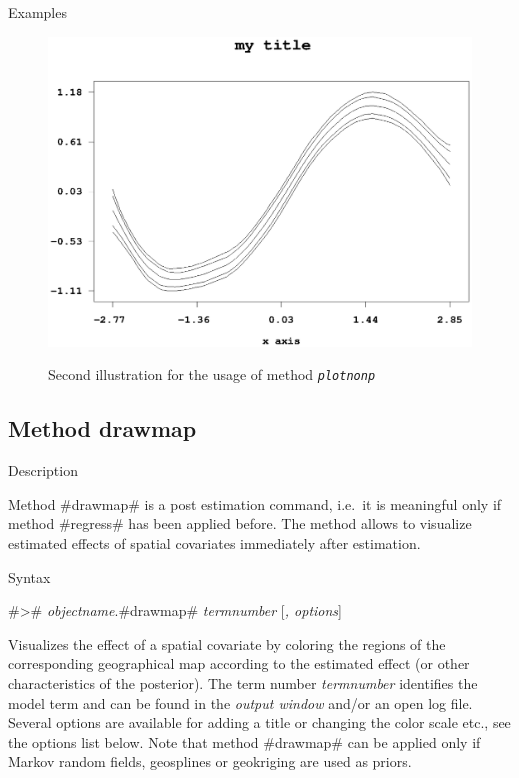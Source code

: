 \begin{stanza}{Examples}
\begin{figure}[p]
\begin{center}
\includegraphics[scale=0.8]{grafiken/plotnonpexample2.ps}
{\em\caption{ \label{plotnonpexample2} Second illustration for the
usage of method \em\tt plotnonp}}
\end{center}
\end{figure}

\end{stanza}

\clearpage

\subsection{Method drawmap} \label{drawmap}

\begin{stanza}{Description}

Method #drawmap# is a post estimation command, i.e.~it is meaningful
only if method #regress# has been applied before. The method allows
to visualize estimated effects of spatial covariates immediately
after estimation.

\end{stanza}

\begin{stanza}{Syntax}

#># {\em objectname}.#drawmap# {\em termnumber} [{\em , options}]

Visualizes the effect of a spatial covariate by coloring the
regions of the corresponding geographical map according to the
estimated effect (or other characteristics of the posterior). The
term number {\em termnumber} identifies the model term and can be
found in the {\em output window} and/or an open log file. Several
options are available for adding a title or changing the color
scale etc., see the options list below. Note that method #drawmap#
can be applied only if Markov random fields, geosplines or
geokriging are used as priors.

\end{stanza}

